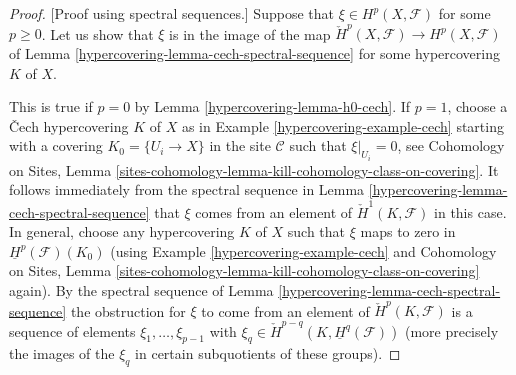 \begin{proof}
[Proof using spectral sequences.]
Suppose that $\xi \in H^p(X, \mathcal{F})$ for some $p \geq 0$.
Let us show that $\xi$ is in the image of the map
$\check{H}^p(X, \mathcal{F}) \to H^p(X, \mathcal{F})$ of
Lemma \ref{hypercovering-lemma-cech-spectral-sequence}
for some hypercovering $K$ of $X$.

\medskip\noindent
This is true if $p = 0$ by Lemma \ref{hypercovering-lemma-h0-cech}.
If $p = 1$, choose a {\v C}ech hypercovering $K$ of $X$ as in
Example \ref{hypercovering-example-cech} starting with a covering
$K_0 = \{U_i \to X\}$ in the site $\mathcal{C}$ such that
$\xi|_{U_i} = 0$, see
Cohomology on Sites,
Lemma \ref{sites-cohomology-lemma-kill-cohomology-class-on-covering}.
It follows immediately from the spectral sequence
in Lemma \ref{hypercovering-lemma-cech-spectral-sequence} that $\xi$ comes
from an element of $\check{H}^1(K, \mathcal{F})$ in this case.
In general, choose any hypercovering $K$ of $X$ such
that $\xi$ maps to zero in $\underline{H}^p(\mathcal{F})(K_0)$
(using Example \ref{hypercovering-example-cech} and
Cohomology on Sites,
Lemma \ref{sites-cohomology-lemma-kill-cohomology-class-on-covering}
again).
By the spectral sequence of Lemma \ref{hypercovering-lemma-cech-spectral-sequence}
the obstruction for $\xi$ to come from an element of
$\check{H}^p(K, \mathcal{F})$ is a sequence of elements
$\xi_1, \ldots, \xi_{p - 1}$ with
$\xi_q \in \check{H}^{p - q}(K, \underline{H}^q(\mathcal{F}))$
(more precisely the images of the $\xi_q$ in certain subquotients
of these groups).


\end{proof}
